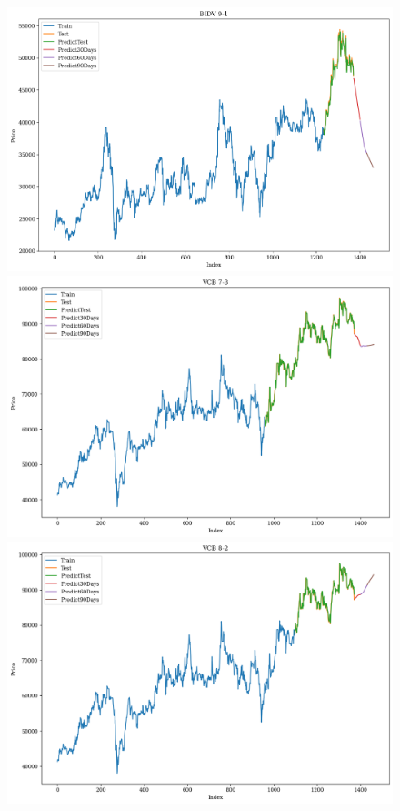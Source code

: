 \begin{figure}[H]
\begin{minipage}{0.15\textwidth}
    \includegraphics[width=1\textwidth]{resources/chapter-5/newdata1/result/BIDV_N-HiTS_9-1.png}
    \end{minipage}
    \hfill
    \begin{minipage}{0.15\textwidth}
    \centering
    \includegraphics[width=1\textwidth]{resources/chapter-5/newdata1/result/VCB_N-HiTS_7-3.png}
    \end{minipage}
    \hfill
    \begin{minipage}{0.15\textwidth}
    \centering
    \includegraphics[width=1\textwidth]{resources/chapter-5/newdata1/result/VCB_N-HiTS_8-2.png}

\end{minipage}
\end{figure}

